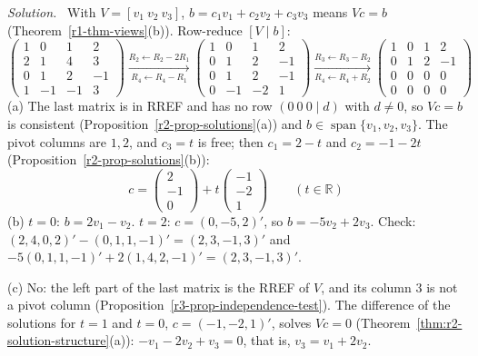 \documentclass[12pt]{article}
\newcommand{\R}{\mathbb R}
\DeclareMathOperator{\Span}{span}
\theoremstyle{definition}
\newenvironment{solution}{\par\noindent\textit{Solution.}\ }{\par\smallskip}
\begin{document}
\begin{solution}
With \(V=[v_1\ v_2\ v_3]\), \(b=c_1v_1+c_2v_2+c_3v_3\) means \(Vc=b\) (Theorem~\ref{r1-thm-views}(b)).
Row-reduce \([V\mid b]\):
\[
\left(\begin{array}{ccc|c}1&0&1&2\\2&1&4&3\\0&1&2&-1\\1&-1&-1&3\end{array}\right)
\xrightarrow[R_4\leftarrow R_4-R_1]{R_2\leftarrow R_2-2R_1}
\left(\begin{array}{ccc|c}1&0&1&2\\0&1&2&-1\\0&1&2&-1\\0&-1&-2&1\end{array}\right)
\xrightarrow[R_4\leftarrow R_4+R_2]{R_3\leftarrow R_3-R_2}
\left(\begin{array}{ccc|c}1&0&1&2\\0&1&2&-1\\0&0&0&0\\0&0&0&0\end{array}\right)
\]
(a) The last matrix is in RREF and has no row \((0\ 0\ 0\mid d)\) with \(d\ne0\), so \(Vc=b\) is
consistent (Proposition~\ref{r2-prop-solutions}(a)) and \(b\in\Span\{v_1,v_2,v_3\}\). The pivot
columns are \(1,2\), and \(c_3=t\) is free; then \(c_1=2-t\) and \(c_2=-1-2t\)
(Proposition~\ref{r2-prop-solutions}(b)):
\[
c=\begin{pmatrix}2\\-1\\0\end{pmatrix}+t\begin{pmatrix}-1\\-2\\1\end{pmatrix}\qquad(t\in\R)
\]
(b) \(t=0\): \(b=2v_1-v_2\). \(t=2\): \(c=(0,-5,2)'\), so \(b=-5v_2+2v_3\). Check:
\((2,4,0,2)'-(0,1,1,-1)'=(2,3,-1,3)'\) and \(-5(0,1,1,-1)'+2(1,4,2,-1)'=(2,3,-1,3)'\).

(c) No: the left part of the last matrix is the RREF of \(V\), and its column \(3\) is not a pivot
column (Proposition~\ref{r3-prop-independence-test}). The difference of the solutions for \(t=1\) and
\(t=0\), \(c=(-1,-2,1)'\), solves \(Vc=0\) (Theorem~\ref{thm:r2-solution-structure}(a)):
\(-v_1-2v_2+v_3=0\), that is, \(v_3=v_1+2v_2\).
\end{solution}
\end{document}

